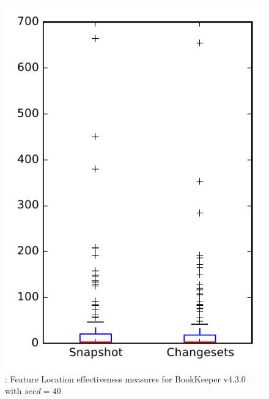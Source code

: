 
\begin{figure}
\centering
\includegraphics[height=0.4\textheight]{figures/flt_seed/rq1_bookkeeper_40}
\caption{\rone: Feature Location effectiveness measures for BookKeeper v4.3.0 with $seed=40$}
\label{fig:flt_seed:rq1:bookkeeper}
\end{figure}
